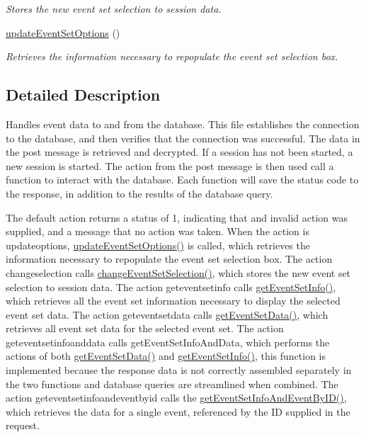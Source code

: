 \begin{DoxyCompactItemize}
\begin{DoxyCompactList}\small\item\em \-Stores the new event set selection to session data. \end{DoxyCompactList}\item 
\hypertarget{event_8php_a93eabb06ba8025e80af7dde1341c758d}{\hyperlink{event_8php_a93eabb06ba8025e80af7dde1341c758d}{update\-Event\-Set\-Options} ()}\label{event_8php_a93eabb06ba8025e80af7dde1341c758d}

\begin{DoxyCompactList}\small\item\em \-Retrieves the information necessary to repopulate the event set selection box. \end{DoxyCompactList}\end{DoxyCompactItemize}


\subsection{\-Detailed \-Description}
\-Handles event data to and from the database. \-This file establishes the connection to the database, and then verifies that the connection was successful. \-The data in the post message is retrieved and decrypted. \-If a session has not been started, a new session is started. \-The action from the post message is then used call a function to interact with the database. \-Each function will save the status code to the response, in addition to the results of the database query.

\-The default action returns a status of 1, indicating that and invalid action was supplied, and a message that no action was taken. \-When the action is updateoptions, \hyperlink{event_8php_a93eabb06ba8025e80af7dde1341c758d}{update\-Event\-Set\-Options()} is called, which retrieves the information necessary to repopulate the event set selection box. \-The action changeselection calls \hyperlink{event_8php_a13aad0d75556ac9ae9f50ee754bd36f5}{change\-Event\-Set\-Selection()}, which stores the new event set selection to session data. \-The action geteventsetinfo calls \hyperlink{event_8php_ac111287cb3782ef6b2b3a5c5333a0164}{get\-Event\-Set\-Info()}, which retrieves all the event set information necessary to display the selected event set data. \-The action geteventsetdata calls \hyperlink{event_8php_a7e9028ad62a69bbcf78178653228b348}{get\-Event\-Set\-Data()}, which retrieves all event set data for the selected event set. \-The action geteventsetinfoanddata calls get\-Event\-Set\-Info\-And\-Data, which performs the actions of both \hyperlink{event_8php_a7e9028ad62a69bbcf78178653228b348}{get\-Event\-Set\-Data()} and \hyperlink{event_8php_ac111287cb3782ef6b2b3a5c5333a0164}{get\-Event\-Set\-Info()}, this function is implemented because the response data is not correctly assembled separately in the two functions and database queries are streamlined when combined. \-The action geteventsetinfoandeventbyid calls the \hyperlink{event_8php_a64e52607180419f5ac4ce6969f9a3725}{get\-Event\-Set\-Info\-And\-Event\-By\-I\-D()}, which retrieves the data for a single event, referenced by the \-I\-D supplied in the request.

